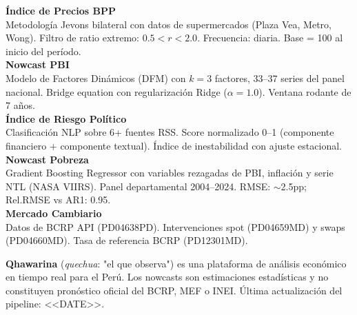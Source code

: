 \documentclass[10pt,a4paper]{article}
\begin{document}
\begin{tcolorbox}[
  enhanced,
  colback=white,
  colframe=border,
  boxrule=0.5pt,
  arc=3pt,
  left=10pt, right=10pt, top=8pt, bottom=8pt,
]
  \small\color{ink}
  \textbf{Índice de Precios BPP}\\
  Metodología Jevons bilateral con datos de supermercados (Plaza Vea, Metro, Wong).
  Filtro de ratio extremo: $0.5 < r < 2.0$. Frecuencia: diaria. Base = 100 al inicio del período.\\[6pt]

  \textbf{Nowcast PBI}\\
  Modelo de Factores Dinámicos (DFM) con $k=3$ factores, 33--37 series del panel nacional.
  Bridge equation con regularización Ridge ($\alpha = 1.0$). Ventana rodante de 7 años.\\[6pt]

  \textbf{Índice de Riesgo Político}\\
  Clasificación NLP sobre 6+ fuentes RSS. Score normalizado 0--1 (componente financiero +
  componente textual). Índice de inestabilidad con ajuste estacional.\\[6pt]

  \textbf{Nowcast Pobreza}\\
  Gradient Boosting Regressor con variables rezagadas de PBI, inflación y serie NTL (NASA VIIRS).
  Panel departamental 2004--2024. RMSE: $\sim$2.5pp; Rel.RMSE vs AR1: 0.95.\\[6pt]

  \textbf{Mercado Cambiario}\\
  Datos de BCRP API (PD04638PD). Intervenciones spot (PD04659MD) y swaps (PD04660MD).
  Tasa de referencia BCRP (PD12301MD).
\end{tcolorbox}

\vspace{1em}

\begin{tcolorbox}[
  enhanced,
  colback=bg,
  colframe=border,
  boxrule=0.5pt,
  arc=2pt,
  left=6pt, right=6pt, top=4pt, bottom=4pt,
]
  {\footnotesize\color{ink3}
    \textbf{Qhawarina} (\textit{quechua}: "el que observa") es una plataforma de análisis
    económico en tiempo real para el Perú. Los nowcasts son estimaciones estadísticas
    y no constituyen pronóstico oficial del BCRP, MEF o INEI.
    Última actualización del pipeline: <<DATE>>.
  }
\end{tcolorbox}
\end{document}
